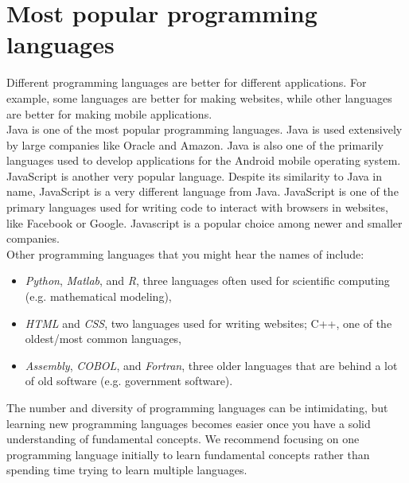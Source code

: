 \section{Most popular programming languages}

Different programming languages are better for different applications. For example, some languages are better for making websites, while other languages are better for making mobile applications. \\

Java is one of the most popular programming languages. Java is used extensively by large companies like Oracle and Amazon. Java is also one of the primarily languages used to develop applications for the Android mobile operating system. \\

JavaScript is another very popular language. Despite its similarity to Java in name, JavaScript is a very different language from Java. JavaScript is one of the primary languages used for writing code to interact with browsers in websites, like Facebook or Google. 
Javascript is a popular choice among newer and smaller companies. \\

Other programming languages that you might hear the names of include:
\begin{itemize}
\item \emph{Python}, \emph{Matlab}, and \emph{R}, three languages often used for scientific computing (e.g. mathematical modeling),
\item \emph{HTML} and \emph{CSS}, two languages used for writing websites; C++, one of the oldest/most common languages,
\item \emph{Assembly}, \emph{COBOL}, and \emph{Fortran}, three older languages that are behind a lot of old software (e.g. government software).
\end{itemize} 

The number and diversity of programming languages can be intimidating, but learning new programming languages becomes easier once you have a solid understanding of fundamental concepts. 
We recommend focusing on one programming language initially to learn fundamental concepts rather than spending time trying to learn multiple languages. \\

